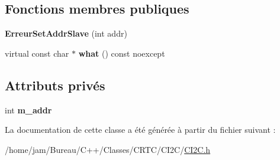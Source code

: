 \subsection*{Fonctions membres publiques}
\begin{DoxyCompactItemize}
\item 
\hypertarget{classCI2C_1_1ErreurSetAddrSlave_ac92f34eb7c68e1b29ae55e0b147bdc02}{{\bfseries Erreur\+Set\+Addr\+Slave} (int addr)}\label{classCI2C_1_1ErreurSetAddrSlave_ac92f34eb7c68e1b29ae55e0b147bdc02}

\item 
\hypertarget{classCI2C_1_1ErreurSetAddrSlave_a6f82e7fa42f2ea5bb39d9c06517c5b09}{virtual const char $\ast$ {\bfseries what} () const noexcept}\label{classCI2C_1_1ErreurSetAddrSlave_a6f82e7fa42f2ea5bb39d9c06517c5b09}

\end{DoxyCompactItemize}
\subsection*{Attributs privés}
\begin{DoxyCompactItemize}
\item 
\hypertarget{classCI2C_1_1ErreurSetAddrSlave_aebf96cc2020fd45215280d41648151d8}{int {\bfseries m\+\_\+addr}}\label{classCI2C_1_1ErreurSetAddrSlave_aebf96cc2020fd45215280d41648151d8}

\end{DoxyCompactItemize}


La documentation de cette classe a été générée à partir du fichier suivant \+:\begin{DoxyCompactItemize}
\item 
/home/jam/\+Bureau/\+C++/\+Classes/\+C\+R\+T\+C/\+C\+I2\+C/\hyperlink{CI2C_8h}{C\+I2\+C.\+h}\end{DoxyCompactItemize}
